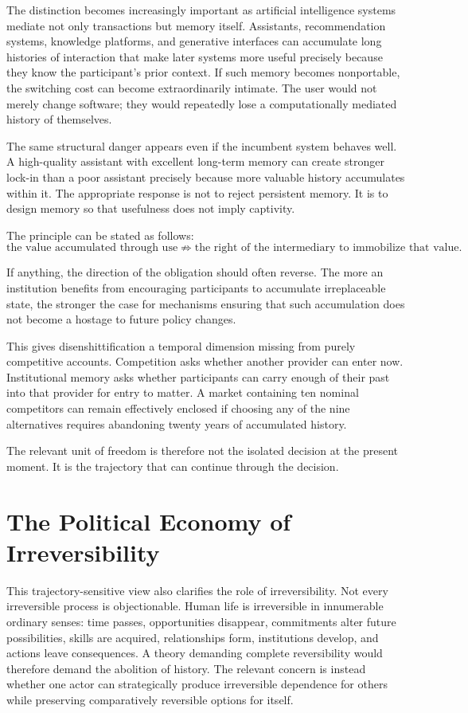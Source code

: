 \documentclass[11pt]{article}
\begin{document}
The distinction becomes increasingly important as artificial intelligence systems mediate not only transactions but memory itself. Assistants, recommendation systems, knowledge platforms, and generative interfaces can accumulate long histories of interaction that make later systems more useful precisely because they know the participant's prior context. If such memory becomes nonportable, the switching cost can become extraordinarily intimate. The user would not merely change software; they would repeatedly lose a computationally mediated history of themselves.

The same structural danger appears even if the incumbent system behaves well. A high-quality assistant with excellent long-term memory can create stronger lock-in than a poor assistant precisely because more valuable history accumulates within it. The appropriate response is not to reject persistent memory. It is to design memory so that usefulness does not imply captivity.

The principle can be stated as follows:
\[
\text{the value accumulated through use}
\not\Rightarrow
\text{the right of the intermediary to immobilize that value}.
\]

If anything, the direction of the obligation should often reverse. The more an institution benefits from encouraging participants to accumulate irreplaceable state, the stronger the case for mechanisms ensuring that such accumulation does not become a hostage to future policy changes.

This gives disenshittification a temporal dimension missing from purely competitive accounts. Competition asks whether another provider can enter now. Institutional memory asks whether participants can carry enough of their past into that provider for entry to matter. A market containing ten nominal competitors can remain effectively enclosed if choosing any of the nine alternatives requires abandoning twenty years of accumulated history.

The relevant unit of freedom is therefore not the isolated decision at the present moment. It is the trajectory that can continue through the decision.

\section{The Political Economy of Irreversibility}

This trajectory-sensitive view also clarifies the role of irreversibility. Not every irreversible process is objectionable. Human life is irreversible in innumerable ordinary senses: time passes, opportunities disappear, commitments alter future possibilities, skills are acquired, relationships form, institutions develop, and actions leave consequences. A theory demanding complete reversibility would therefore demand the abolition of history. The relevant concern is instead whether one actor can strategically produce irreversible dependence for others while preserving comparatively reversible options for itself.
\end{document}
